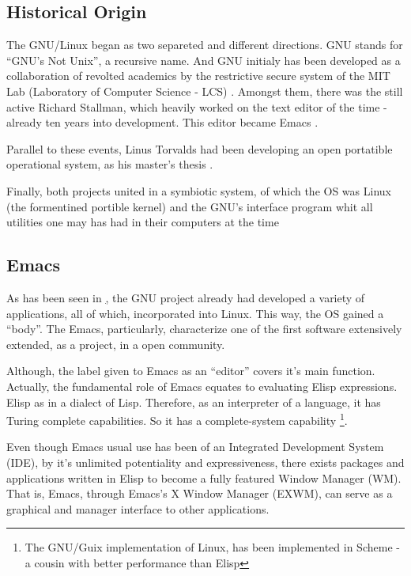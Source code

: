 \documentclass[
12pt,				%
openright,			%
oneside,			%
a4paper,			%
brazil,				%
english,			%
]{abntex2}
\begin{document}
\subsection{\label{sec:linux-origin}Historical Origin}

The GNU/Linux began as two separeted and different directions. GNU
stands for ``GNU's Not Unix'', a recursive name. And GNU initialy has
been developed as a collaboration of revolted academics by the
restrictive secure system of the MIT Lab (Laboratory of Computer
Science - LCS) \cite{stallman2002my,emacswiki2021history}. Amongst
them, there was the still active Richard Stallman, which heavily
worked on the text editor of the time - already ten years into
development. This editor became Emacs \cite{emacswiki2021history}.   

Parallel to these events, Linus Torvalds had been developing an open portatible
operational system, as his master's thesis
\cite{torvalds1997linux}.

Finally, both projects united in a symbiotic system, of which the OS
was Linux (the formentined portible kernel) and the GNU's interface
program whit all utilities one may has had in their computers at the
time \cite{stallman1997}  

\subsection{Emacs}

As has been seen in \href{sec:linux-origin}, the GNU project already
had developed a variety of applications, all of which, incorporated
into Linux. This way, the OS gained a ``body''. The Emacs,
particularly, characterize one of the first software extensively
extended, as a project, in a open community.

Although, the label given to Emacs as an ``editor'' covers it's main
function. Actually, the fundamental role of Emacs equates to
evaluating Elisp expressions. Elisp as in a dialect of
Lisp. Therefore, as an interpreter of a language, it has Turing
complete capabilities. So it has a complete-system capability
\footnote{The GNU/Guix implementation of Linux, has been implemented
  in Scheme - a cousin with better performance than Elisp}.      

Even though Emacs usual use has been of an Integrated Development
System (IDE), by it's unlimited potentiality and expressiveness, there
exists packages and applications written in Elisp to become a fully
featured Window Manager (WM). That is, Emacs, through Emacs's X Window
Manager (EXWM), can serve as a graphical and manager interface to
other applications. 
\end{document}
